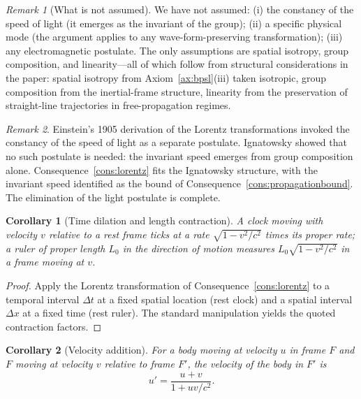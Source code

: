 \documentclass[11pt,twocolumn,a4paper]{article}
\theoremstyle{axiomstyle}
\theoremstyle{conseqstyle}
\newtheorem{corollary}{Corollary}
\theoremstyle{definition}
\theoremstyle{remark}
\newtheorem*{remark}{Remark}
\begin{document}
\begin{remark}[What is not assumed]
We have not assumed: (i) the constancy of the speed of light (it emerges as the invariant of the group); (ii) a specific physical mode (the argument applies to any wave-form-preserving transformation); (iii) any electromagnetic postulate. The only assumptions are spatial isotropy, group composition, and linearity---all of which follow from structural considerations in the paper: spatial isotropy from Axiom~\ref{ax:bpsl}(iii) taken isotropic, group composition from the inertial-frame structure, linearity from the preservation of straight-line trajectories in free-propagation regimes.
\end{remark}

\begin{remark}
Einstein's 1905 derivation \citep{einstein1905relativity} of the Lorentz transformations invoked the constancy of the speed of light as a separate postulate. Ignatowsky \citep{ignatowsky1910} showed that no such postulate is needed: the invariant speed emerges from group composition alone. Consequence~\ref{cons:lorentz} fits the Ignatowsky structure, with the invariant speed identified as the bound of Consequence~\ref{cons:propagationbound}. The elimination of the light postulate is complete.
\end{remark}

\begin{corollary}[Time dilation and length contraction]
\label{cor:timedil}
A clock moving with velocity $v$ relative to a rest frame ticks at a rate $\sqrt{1-v^{2}/c^{2}}$ times its proper rate; a ruler of proper length $L_{0}$ in the direction of motion measures $L_{0}\sqrt{1-v^{2}/c^{2}}$ in a frame moving at $v$.
\end{corollary}

\begin{proof}
Apply the Lorentz transformation of Consequence~\ref{cons:lorentz} to a temporal interval $\Delta t$ at a fixed spatial location (rest clock) and a spatial interval $\Delta x$ at a fixed time (rest ruler). The standard manipulation \citep{landaulifshitz1} yields the quoted contraction factors.
\end{proof}

\begin{corollary}[Velocity addition]
\label{cor:veladd}
For a body moving at velocity $u$ in frame $F$ and $F$ moving at velocity $v$ relative to frame $F'$, the velocity of the body in $F'$ is
\begin{equation}
u'=\frac{u+v}{1+uv/c^{2}}.
\label{eq:veladd}
\end{equation}
\end{corollary}
\end{document}
